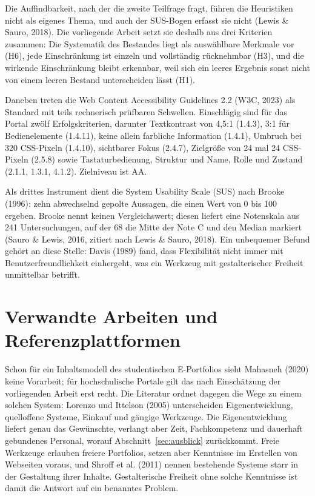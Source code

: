 Die Auffindbarkeit, nach der die zweite Teilfrage fragt, führen die Heuristiken nicht als eigenes Thema, und auch der SUS-Bogen erfasst sie nicht (Lewis \& Sauro, 2018). Die vorliegende Arbeit setzt sie deshalb aus drei Kriterien zusammen: Die Systematik des Bestandes liegt als auswählbare Merkmale vor (H6), jede Einschränkung ist einzeln und vollständig rücknehmbar (H3), und die wirkende Einschränkung bleibt erkennbar, weil sich ein leeres Ergebnis sonst nicht von einem leeren Bestand unterscheiden lässt (H1).

Daneben treten die Web Content Accessibility Guidelines 2.2 (W3C, 2023) als Standard mit teils rechnerisch prüfbaren Schwellen. Einschlägig sind für das Portal zwölf Erfolgskriterien, darunter Textkontrast von 4,5:1 (1.4.3), 3:1 für Bedienelemente (1.4.11), keine allein farbliche Information (1.4.1), Umbruch bei 320 CSS-Pixeln (1.4.10), sichtbarer Fokus (2.4.7), Zielgröße von 24 mal 24 CSS-Pixeln (2.5.8) sowie Tastaturbedienung, Struktur und Name, Rolle und Zustand (2.1.1, 1.3.1, 4.1.2). Zielniveau ist AA.

Als drittes Instrument dient die System Usability Scale (SUS) nach Brooke (1996): zehn abwechselnd gepolte Aussagen, die einen Wert von 0 bis 100 ergeben. Brooke nennt keinen Vergleichswert; diesen liefert eine Notenskala aus 241 Untersuchungen, auf der 68 die Mitte der Note C und den Median markiert (Sauro \& Lewis, 2016, zitiert nach Lewis \& Sauro, 2018). Ein unbequemer Befund gehört an diese Stelle: Davis (1989) fand, dass Flexibilität nicht immer mit Benutzerfreundlichkeit einhergeht, was ein Werkzeug mit gestalterischer Freiheit unmittelbar betrifft.

\section{Verwandte Arbeiten und Referenzplattformen}
\label{sec:verwandte-arbeiten}

Schon für ein Inhaltsmodell des studentischen E-Portfolios sieht Mahasneh (2020) keine Vorarbeit; für hochschulische Portale gilt das nach Einschätzung der vorliegenden Arbeit erst recht. Die Literatur ordnet dagegen die Wege zu einem solchen System: Lorenzo und Ittelson (2005) unterscheiden Eigenentwicklung, quelloffene Systeme, Einkauf und gängige Werkzeuge. Die Eigenentwicklung liefert genau das Gewünschte, verlangt aber Zeit, Fachkompetenz und dauerhaft gebundenes Personal, worauf Abschnitt~\ref{sec:ausblick} zurückkommt. Freie Werkzeuge erlauben freiere Portfolios, setzen aber Kenntnisse im Erstellen von Webseiten voraus, und Shroff et al. (2011) nennen bestehende Systeme starr in der Gestaltung ihrer Inhalte. Gestalterische Freiheit ohne solche Kenntnisse ist damit die Antwort auf ein benanntes Problem.

